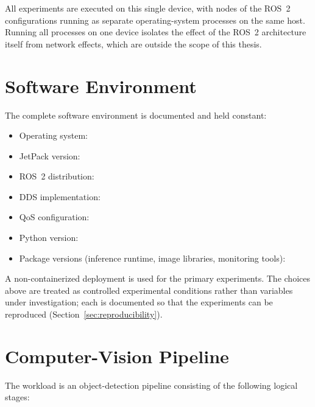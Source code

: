 All experiments are executed on this single device, with nodes of the
ROS~2 configurations running as separate operating-system processes on
the same host. Running all processes on one device isolates the effect of
the ROS~2 architecture itself from network effects, which are outside the
scope of this thesis.

\section{Software Environment}
\label{sec:software-environment}

The complete software environment is documented and held constant:

\begin{itemize}
  \item Operating system: 
  \item JetPack version: 
  \item ROS~2 distribution: 
  \item DDS implementation: 
  \item QoS configuration: 
  \item Python version: 
  \item Package versions (inference runtime, image libraries, monitoring
        tools): 
\end{itemize}

A non-containerized deployment is used for the primary experiments. The
choices above are treated as controlled experimental conditions rather
than variables under investigation; each is documented so that the
experiments can be reproduced (Section~\ref{sec:reproducibility}).

\section{Computer-Vision Pipeline}
\label{sec:pipeline}

The workload is an object-detection pipeline consisting of the following
logical stages:

